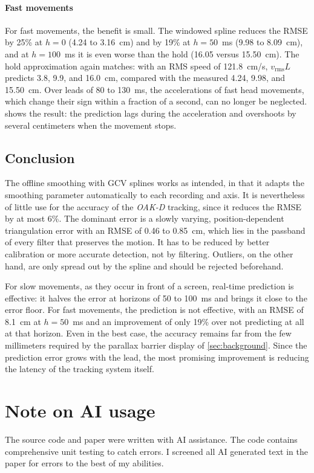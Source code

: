 \documentclass{siamart251216}
\begin{document}
\paragraph{Fast movements}
For fast movements, the benefit is small.
The windowed spline reduces the RMSE by 25\% at $h = 0$ (4.24 to 3.16~cm) and by 19\% at $h = 50$~ms (9.98 to 8.09~cm), and at $h = 100$~ms it is even worse than the hold (16.05 versus 15.50~cm).
The hold approximation again matches: with an RMS speed of 121.8~cm/s, $v_{\text{rms}} L$ predicts 3.8, 9.9, and 16.0~cm, compared with the measured 4.24, 9.98, and 15.50~cm.
Over leads of 80 to 130~ms, the accelerations of fast head movements, which change their sign within a fraction of a second, can no longer be neglected.
 shows the result: the prediction lags during the acceleration and overshoots by several centimeters when the movement stops.

\subsection{Conclusion}

The offline smoothing with GCV splines works as intended, in that it adapts the smoothing parameter automatically to each recording and axis.
It is nevertheless of little use for the accuracy of the \emph{OAK-D} tracking, since it reduces the RMSE by at most 6\%.
The dominant error is a slowly varying, position-dependent triangulation error with an RMSE of 0.46 to 0.85~cm, which lies in the passband of every filter that preserves the motion.
It has to be reduced by better calibration or more accurate detection, not by filtering.
Outliers, on the other hand, are only spread out by the spline and should be rejected beforehand.

For slow movements, as they occur in front of a screen, real-time prediction is effective:
it halves the error at horizons of 50 to 100~ms and brings it close to the error floor.
For fast movements, the prediction is not effective, with an RMSE of 8.1~cm at $h = 50$~ms and an improvement of only 19\% over not predicting at all at that horizon.
Even in the best case, the accuracy remains far from the few millimeters required by the parallax barrier display of \cref{sec:background}.
Since the prediction error grows with the lead, the most promising improvement is reducing the latency of the tracking system itself.

\section{Note on AI usage}

The source code and paper were written with AI assistance. The code contains comprehensive unit testing to catch errors.
I screened all AI generated text in the paper for errors to the best of my abilities.



\end{document}
